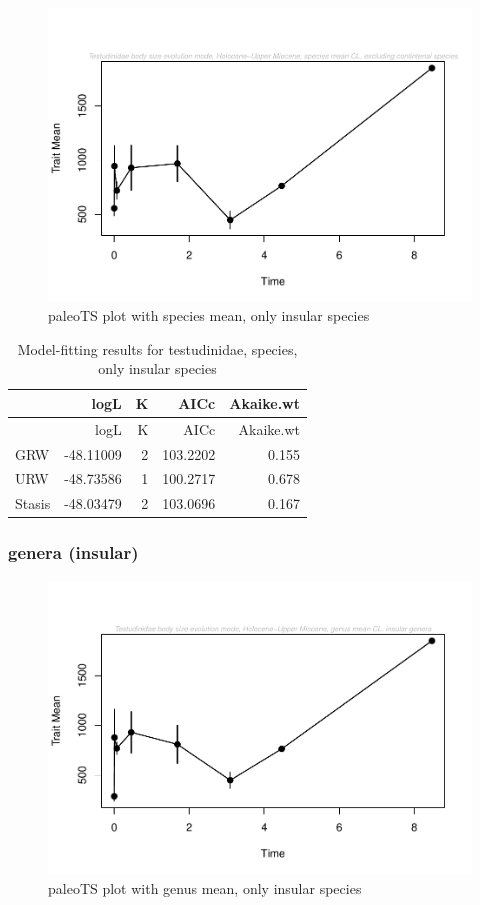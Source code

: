 \documentclass[]{article}
\begin{document}
\begin{figure}[htbp]
\centering
\includegraphics{MA_JJ_files/figure-latex/paleoTS plot with species mean, excluding continental species-1.pdf}
\caption{paleoTS plot with species mean, only insular species}
\end{figure}

\begin{longtable}[]{@{}lrrrr@{}}
\caption{Model-fitting results for testudinidae, species, only insular
species}\tabularnewline
\toprule
& logL & K & AICc & Akaike.wt\tabularnewline
\midrule
\endfirsthead
\toprule
& logL & K & AICc & Akaike.wt\tabularnewline
\midrule
\endhead
GRW & -48.11009 & 2 & 103.2202 & 0.155\tabularnewline
URW & -48.73586 & 1 & 100.2717 & 0.678\tabularnewline
Stasis & -48.03479 & 2 & 103.0696 & 0.167\tabularnewline
\bottomrule
\end{longtable}

\newpage

\subsubsection{genera (insular)}\label{genera-insular}

\begin{figure}[htbp]
\centering
\includegraphics{MA_JJ_files/figure-latex/paleoTS plot with genus mean, excluding continental species-1.pdf}
\caption{paleoTS plot with genus mean, only insular species}
\end{figure}
\end{document}
